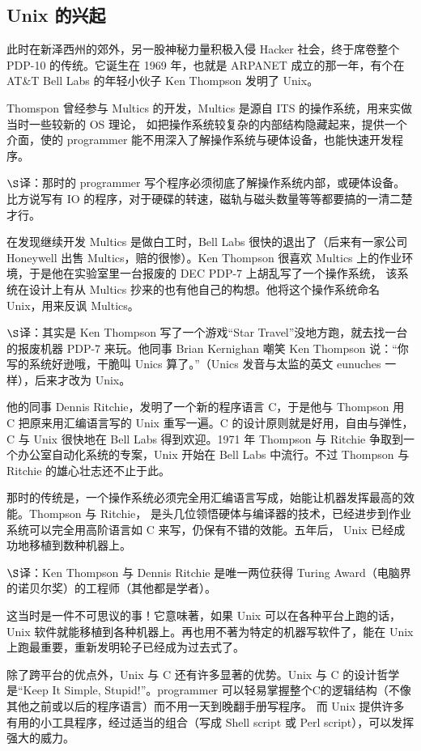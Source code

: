 \subsection{Unix 的兴起}

此时在新泽西州的郊外，另一股神秘力量积极入侵 Hacker 社会，终于席卷整个 PDP-10 的传统。它诞生在 1969 年，也就是 ARPANET 成立的那一年，有个在 AT\&T Bell Labs 的年轻小伙子 Ken Thompson 发明了 Unix。

Thomspon 曾经参与 Multics 的开发，Multics 是源自 ITS 的操作系统，用来实做当时一些较新的 OS 理论， 如把操作系统较复杂的内部结构隐藏起来，提供一个介面，使的 programmer 能不用深入了解操作系统与硬体设备，也能快速开发程序。

$\S$译：那时的 programmer 写个程序必须彻底了解操作系统内部，或硬体设备。比方说写有 IO 的程序，对于硬碟的转速，磁轨与磁头数量等等都要搞的一清二楚才行。

在发现继续开发 Multics 是做白工时，Bell Labs 很快的退出了（后来有一家公司 Honeywell 出售 Multics，赔的很惨）。Ken Thompson 很喜欢 Multics 上的作业环境，于是他在实验室里一台报废的 DEC PDP-7 上胡乱写了一个操作系统，  该系统在设计上有从 Multics 抄来的也有他自己的构想。他将这个操作系统命名 Unix，用来反讽 Multics。

$\S$译：其实是 Ken Thompson 写了一个游戏“Star Travel”没地方跑，就去找一台的报废机器 PDP-7 来玩。他同事 Brian Kernighan 嘲笑 Ken Thompson 说：“你写的系统好逊哦，干脆叫 Unics 算了。”（Unics 发音与太监的英文 eunuches 一样），后来才改为 Unix。

他的同事 Dennis Ritchie，发明了一个新的程序语言 C，于是他与 Thompson 用 C 把原来用汇编语言写的 Unix 重写一遍。C 的设计原则就是好用，自由与弹性，C 与 Unix 很快地在 Bell Labs 得到欢迎。1971 年 Thompson 与 Ritchie 争取到一个办公室自动化系统的专案，Unix 开始在 Bell Labs 中流行。不过 Thompson 与 Ritchie 的雄心壮志还不止于此。

那时的传统是，一个操作系统必须完全用汇编语言写成，始能让机器发挥最高的效能。Thompson 与 Ritchie， 是头几位领悟硬体与编译器的技术，已经进步到作业系统可以完全用高阶语言如 C 来写，仍保有不错的效能。五年后， Unix 已经成功地移植到数种机器上。

$\S$译：Ken Thompson 与 Dennis Ritchie 是唯一两位获得 Turing Award（电脑界的诺贝尔奖）的工程师（其他都是学者）。

这当时是一件不可思议的事！它意味著，如果 Unix 可以在各种平台上跑的话，Unix 软件就能移植到各种机器上。再也用不著为特定的机器写软件了，能在 Unix 上跑最重要，重新发明轮子已经成为过去式了。

除了跨平台的优点外，Unix 与 C 还有许多显著的优势。Unix 与 C 的设计哲学是“Keep It Simple, Stupid!”。programmer 可以轻易掌握整个C的逻辑结构（不像其他之前或以后的程序语言）而不用一天到晚翻手册写程序。 而 Unix 提供许多有用的小工具程序，经过适当的组合（写成 Shell script 或 Perl script），可以发挥强大的威力。

